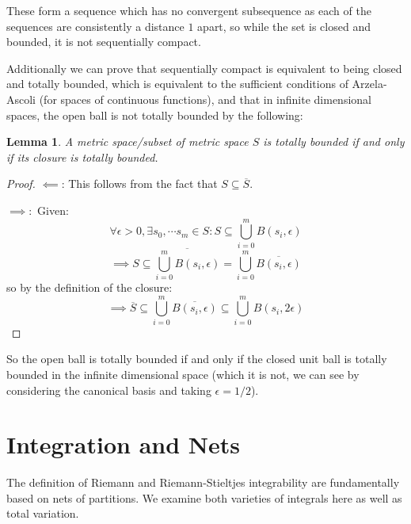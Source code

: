 \documentclass[10pt,letterpaper]{article} %
\newtheorem{lem}{Lemma}[section]
\begin{document}
These form a sequence which has no convergent subsequence as each of the sequences are consistently a distance $1$ apart, so while the set is closed and bounded, it is not sequentially compact.

Additionally we can prove that sequentially compact is equivalent to being closed and totally bounded, which is equivalent to the sufficient conditions of Arzela-Ascoli (for spaces of continuous functions), and that in infinite dimensional spaces, the open ball is not totally bounded by the following:
\begin{lem}
A metric space/subset of metric space $S$ is totally bounded if and only if its closure is totally bounded.   
\end{lem}
\begin{proof}
$\impliedby$: This follows from the fact that $S \subseteq \overline{S}$.

$\implies:$ Given:
\begin{equation*}
\forall \epsilon > 0, \exists s_0, \cdots s_m \in S: S \subseteq \bigcup_{i=0}^m B(s_i, \epsilon)
\end{equation*}
\begin{equation*}
\implies S \subseteq \overline{\bigcup_{i=0}^m B(s_i, \epsilon)} = \bigcup_{i=0}^m \overline{B(s_i, \epsilon)}
\end{equation*}
so by the definition of the closure:
\begin{equation*}
\implies \overline{S} \subseteq \bigcup_{i=0}^m \overline{B(s_i, \epsilon)} \subseteq \bigcup_{i=0}^m B(s_i, 2\epsilon)
\end{equation*}
\end{proof}
So the open ball is totally bounded if and only if the closed unit ball is totally bounded in the infinite dimensional space (which it is not, we can see by considering the canonical basis and taking $\epsilon = 1/2$).
\pagebreak

\section{Integration and Nets}
The definition of Riemann and Riemann-Stieltjes integrability are fundamentally based on nets of partitions. We examine both varieties of integrals here as well as total variation.
\end{document}
